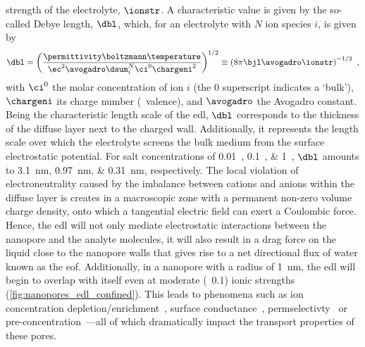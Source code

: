 strength of the electrolyte, $\ionstr$. A characteristic value is given by the so-called Debye length, $\dbl$,
which, for an electrolyte with $N$ ion species $i$, is given by~\cite{Bocquet-2010}
%
\begin{equation}\label{eq:nanopores_debye_length}
  \dbl = \left(
          \dfrac{ \permittivity \boltzmann \temperature }%
                { \ec^2 \avogadro \dsum_i^N \ci^0 \chargeni^2 } \right)^{1/2}
       \equiv \left( 8 \pi \bjl \avogadro \ionstr \right)^{-1/2}
  \text{ ,}
\end{equation}
%
with $\ci^0$ the molar concentration of ion $i$ (the $0$ superscript indicates a `bulk'), $\chargeni$ its
charge number (\ie~valence), and $\avogadro$ the Avogadro constant. Being the characteristic length scale of
the \gls{edl}, $\dbl$ corresponds to the thickness of the diffuse layer next to the charged wall.
Additionally, it represents the length scale over which the electrolyte screens the bulk medium from the
surface electrostatic potential. For salt concentrations of \SIlist{0.01;0.1;1}{\Molar}, $\dbl$ amounts to
\SIlist{3.1;0.97;0.31}{\nm}, respectively. The local violation of electroneutrality caused by the imbalance
between cations and anions within the diffuse layer is creates in a macroscopic zone with a permanent non-zero
volume charge density, onto which a tangential electric field can exert a Coulombic force. Hence, the
\gls{edl} will not only mediate electrostatic interactions between the nanopore and the analyte molecules, it
will also result in a drag force on the liquid close to the nanopore walls that gives rise to a net
directional flux of water known as the \gls{eof}. Additionally, in a nanopore with a radius of \SI{1}{\nm},
the \gls{edl} will begin to overlap with itself even at moderate (\eg~\SI{0.1}{\Molar}) ionic strengths
(\cref{fig:nanopores_edl_confined}). This leads to phenomena such as ion concentration
depletion/enrichment~\cite{Plecis-2005}, surface conductance~\cite{Stein-2004},
permselectivty~\cite{Plecis-2005} or pre-concentration~\cite{Pu-2004}---all of which dramatically impact the
transport properties of these pores.

